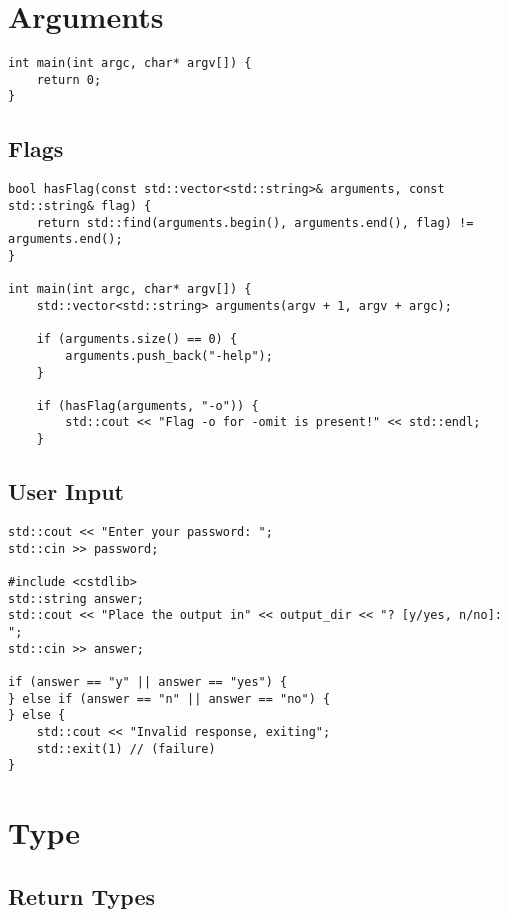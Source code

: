 \section{Arguments}

\begin{verbatim}
int main(int argc, char* argv[]) {
    return 0;
}
\end{verbatim}

\subsection{Flags}

\begin{verbatim}
bool hasFlag(const std::vector<std::string>& arguments, const std::string& flag) {
    return std::find(arguments.begin(), arguments.end(), flag) != arguments.end();
}

int main(int argc, char* argv[]) {
    std::vector<std::string> arguments(argv + 1, argv + argc);

    if (arguments.size() == 0) {
        arguments.push_back("-help");
    }

    if (hasFlag(arguments, "-o")) {
        std::cout << "Flag -o for -omit is present!" << std::endl;
    }
\end{verbatim}

\subsection{User Input}

\begin{verbatim}
std::cout << "Enter your password: ";
std::cin >> password;

#include <cstdlib>
std::string answer;
std::cout << "Place the output in" << output_dir << "? [y/yes, n/no]: ";
std::cin >> answer;

if (answer == "y" || answer == "yes") {
} else if (answer == "n" || answer == "no") {
} else {
    std::cout << "Invalid response, exiting";
    std::exit(1) // (failure)
}
\end{verbatim}

\section{Type}

\subsection{Return Types}

